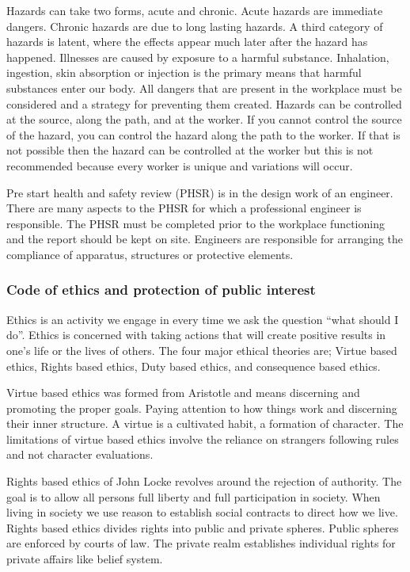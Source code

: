 \documentclass[12pt,a4paper]{report}
\begin{document}
    Hazards can take two forms, acute and chronic. Acute hazards are immediate dangers. Chronic hazards are due to long lasting hazards. A third category of hazards is latent, where the effects appear much later after the hazard has happened. Illnesses are caused by exposure to a harmful substance. Inhalation, ingestion, skin absorption or injection is the primary means that harmful substances enter our body. All dangers that are present in the workplace must be considered and a strategy for preventing them created. Hazards can be controlled at the source, along the path, and at the worker. If you cannot control the source of the hazard, you can control the hazard along the path to the worker. If that is not possible then the hazard can be controlled at the worker but this is not recommended because every worker is unique and variations will occur. \par
    
    Pre start health and safety review (PHSR) is in the design work of an engineer. There are many aspects to the PHSR for which a professional engineer is responsible. The PHSR must be completed prior to the workplace functioning and the report should be kept on site. Engineers are responsible for arranging the compliance of apparatus, structures or protective elements.
    
    
    
    \subsubsection{Code of ethics and protection of public interest}
    
    Ethics is an activity we engage in every time we ask the question “what should I do”. Ethics is concerned with taking actions that will create positive results in one’s life or the lives of others. The four major ethical theories are; Virtue based ethics, Rights based ethics, Duty based ethics, and consequence based ethics.
    \par
    Virtue based ethics was formed from Aristotle and means discerning and promoting the proper goals. Paying attention to how things work and discerning their inner structure. A virtue is a cultivated habit, a formation of character. The limitations of virtue based ethics involve the reliance on strangers following rules and not character evaluations.\par
    
    Rights based ethics of John Locke revolves around the rejection of authority. The goal is to allow all persons full liberty and full participation in society. When living in society we use reason to establish social contracts to direct how we live. Rights based ethics divides rights into public and private spheres. Public spheres are enforced by courts of law. The private realm establishes individual rights for private affairs like belief system. \par
    
\end{document}
